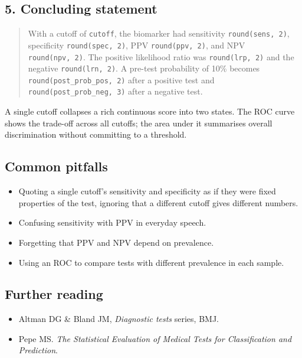 \documentclass[
]{article}
\providecommand{\tightlist}{%
  \setlength{\itemsep}{0pt}\setlength{\parskip}{0pt}}
\begin{document}
\subsection{5. Concluding statement}\label{concluding-statement}

\begin{quote}
With a cutoff of \texttt{cutoff}, the biomarker had sensitivity
\texttt{round(sens,\ 2)}, specificity \texttt{round(spec,\ 2)}, PPV
\texttt{round(ppv,\ 2)}, and NPV \texttt{round(npv,\ 2)}. The positive
likelihood ratio was \texttt{round(lrp,\ 2)} and the negative
\texttt{round(lrn,\ 2)}. A pre-test probability of 10\% becomes
\texttt{round(post\_prob\_pos,\ 2)} after a positive test and
\texttt{round(post\_prob\_neg,\ 3)} after a negative test.
\end{quote}

A single cutoff collapses a rich continuous score into two states. The
ROC curve shows the trade-off across all cutoffs; the area under it
summarises overall discrimination without committing to a threshold.

\subsection{Common pitfalls}\label{common-pitfalls}

\begin{itemize}
\tightlist
\item
  Quoting a single cutoff's sensitivity and specificity as if they were
  fixed properties of the test, ignoring that a different cutoff gives
  different numbers.
\item
  Confusing sensitivity with PPV in everyday speech.
\item
  Forgetting that PPV and NPV depend on prevalence.
\item
  Using an ROC to compare tests with different prevalence in each
  sample.
\end{itemize}

\subsection{Further reading}\label{further-reading}

\begin{itemize}
\tightlist
\item
  Altman DG \& Bland JM, \emph{Diagnostic tests} series, BMJ.
\item
  Pepe MS. \emph{The Statistical Evaluation of Medical Tests for
  Classification and Prediction}.
\end{itemize}
\end{document}
